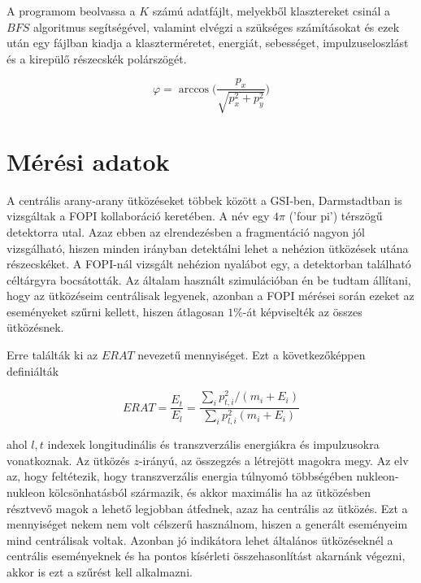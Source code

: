 \documentclass[a4paper,12pt]{article}
\begin{document}
\vspace{5mm}

\par A programom beolvassa a $K$ számú adatfájlt, melyekből klasztereket csinál a $BFS$ algoritmus segítségével, valamint elvégzi a szükséges számításokat és ezek után egy fájlban kiadja a klaszterméretet, energiát, sebességet, impulzuseloszlást és a kirepülő részecskék polárszögét.

\vspace{5mm}

\begin{equation}
\varphi = \arccos\Big(\frac{p_{x}}{\sqrt{p_{x}^{2} + p_{y}^{2}}}\Big)
\end{equation}

\vspace{5mm}

\section{ Mérési adatok}

\par A centrális arany-arany ütközéseket többek között a GSI-ben, Darmstadtban is vizsgáltak a FOPI kollaboráció keretében. A név egy $4\pi$ ('four pi') térszögű detektorra utal. Azaz ebben az elrendezésben a fragmentáció nagyon jól vizsgálható, hiszen minden irányban detektálni lehet a nehézion ütközések utána részecskéket. A FOPI-nál vizsgált nehézion nyalábot egy, a detektorban található céltárgyra bocsátották. Az általam használt szimulációban én be tudtam állítani, hogy az ütközéseim centrálisak legyenek, azonban a FOPI mérései során ezeket az eseményeket szűrni kellett, hiszen átlagosan $1\%$-át képviselték az összes ütközésnek.

\vspace{5mm}

\par Erre találták ki az $ERAT$ nevezetű mennyiséget. Ezt a következőképpen definiálták

\vspace{5mm}

\begin{equation}
ERAT = \frac{E_{t}}{E_{l}} = \frac{\sum_{i} p_{t,i}^{2}/(m_{i} + E_{i})}{\sum_{i} p_{l,i}^{2}(m_{i} + E_{i})}
\end{equation}

\vspace{5mm}

\par ahol $l,t$ indexek longitudinális és transzverzális energiákra és impulzusokra vonatkoznak. Az ütközés $z$-irányú, az összegzés a létrejött magokra megy. Az elv az, hogy feltétezik, hogy transzverzális energia túlnyomó többségében nukleon-nukleon kölcsönhatásból származik, és akkor maximális ha az ütközésben résztvevő magok a lehető legjobban átfednek, azaz ha centrális az ütközés. Ezt a mennyiséget nekem nem volt célszerű használnom, hiszen a generált eseményeim mind centrálisak voltak. Azonban jó indikátora lehet általános ütközéseknél a centrális eseményeknek és ha pontos kísérleti összehasonlítást akarnánk végezni, akkor is ezt a szűrést kell alkalmazni.
\end{document}
